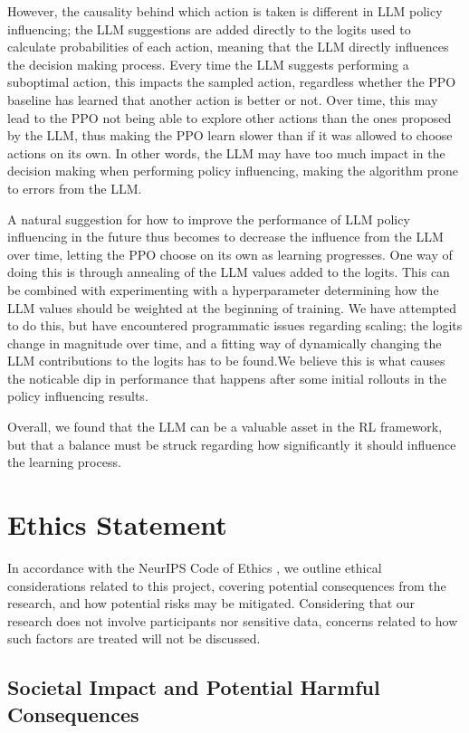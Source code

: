 \documentclass[conference]{IEEEtran}
\begin{document}
However, the causality behind which action is taken is different in LLM policy influencing; the LLM suggestions are added directly to the logits used to calculate probabilities of each action, meaning that the LLM directly influences the decision making process. Every time the LLM suggests performing a suboptimal action, this impacts the sampled action, regardless whether the PPO baseline has learned that another action is better or not. Over time, this may lead to the PPO not being able to explore other actions than the ones proposed by the LLM, thus making the PPO learn slower than if it was allowed to choose actions on its own. In other words, the LLM may have too much impact in the decision making when performing policy influencing, making the algorithm prone to errors from the LLM.

A natural suggestion for how to improve the performance of LLM policy influencing in the future thus becomes to decrease the influence from the LLM over time, letting the PPO choose on its own as learning progresses. One way of doing this is through annealing of the LLM values added to the logits. This can be combined with experimenting with a hyperparameter determining how the LLM values should be weighted at the beginning of training. We have attempted to do this, but have encountered programmatic issues regarding scaling; the logits change in magnitude over time, and a fitting way of dynamically changing the LLM contributions to the logits has to be found.We believe this is what causes the noticable dip in performance that happens after some initial rollouts in the policy influencing results.

Overall, we found that the LLM can be a valuable asset in the RL framework, but that a balance must be struck regarding how significantly it should influence the learning process.

\section*{Ethics Statement}

In accordance with the NeurIPS Code of Ethics \cite{ethics}, we outline ethical considerations related to this project, covering potential consequences from the research, and how potential risks may be mitigated. Considering that our research does not involve participants nor sensitive data, concerns related to how such factors are treated will not be discussed.

\subsection{Societal Impact and Potential Harmful Consequences}
\end{document}
